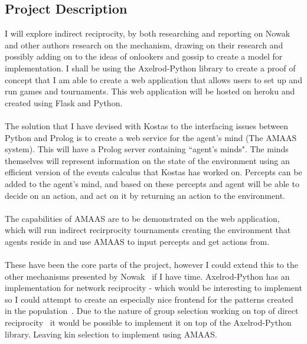 \documentclass{article}
\begin{document}
\subsection*{Project Description}
I will explore indirect reciprocity, by both researching and reporting on Nowak and other authors research on the mechanism, drawing on their research and possibly adding on to the ideas of onlookers and gossip to create a model for implementation. I shall be using the Axelrod-Python library to create a proof of concept that I am able to create a web application that allows users to set up and run games and tournaments. This web application will be hosted on heroku and created using Flask and Python.\\\\
The solution that I have devised with Kostas to the interfacing issues between Python and Prolog is to create a web service for the agent's mind (The AMAAS system). This will have a Prolog server containing ``agent's minds". The minds themselves will represent information on the state of the environment using an efficient version of the events calculus that Kostas has worked on. Percepts can be added to the agent's mind, and based on these percepts and agent will be able to decide on an action, and act on it by returning an action to the environment.\\\\
The capabilities of AMAAS are to be demonstrated on the web application, which will run indirect recirprocity tournaments creating the environment that agents reside in and use AMAAS to input percepts and get actions from.\\\\
These have been the core parts of the project, however I could extend this to the other mechanisms presented by Nowak~\cite{five_rules_coop} if I have time. Axelrod-Python has an implementation for network reciprocity - which would be interesting to implement so I could attempt to create an especially nice frontend for the patterns created in the population~\cite{spatial}. Due to the nature of group selection working on top of direct reciprocity~\cite{multilevel_nowak} it would be possible to implement it on top of the Axelrod-Python library. Leaving kin selection to implement using AMAAS.
\end{document}
